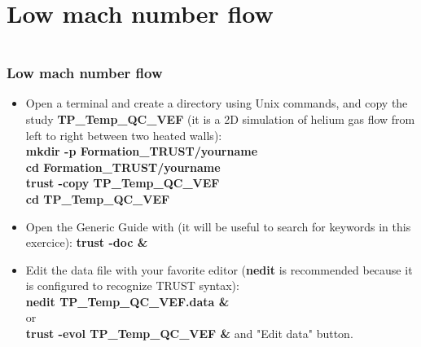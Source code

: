 \documentclass[10pt, hyperref={unicode=true,pdfusetitle, bookmarks=true,bookmarksnumbered=false,bookmarksopen=false, breaklinks=false,pdfborder={0 0 1},backref=true,colorlinks=true,linkcolor=darkblue,pageanchor}]{beamer}
\begin{document}
\section{{\bf{Low mach number flow}}}
\begin{frame}
\begin{columns}[c] 
\tableofcontents[sections={1-9},currentsection, currentsubsection]
\tableofcontents[sections={10-16},currentsection, currentsubsection]
\end{columns}
\end{frame}
\begin{frame}
\frametitle{Low mach number flow}
\begin{block}{}

\begin{itemize}
\item Open a terminal and create a directory using Unix commands, and copy the study \textbf{TP\_Temp\_QC\_VEF} (it is a 2D simulation of helium gas flow from left to right between two heated walls):\\
\textbf{mkdir -p Formation\_TRUST/yourname}\\
\textbf{cd Formation\_TRUST/yourname}\\
\textbf{trust -copy TP\_Temp\_QC\_VEF}\\
\textbf{cd TP\_Temp\_QC\_VEF}

\item Open the Generic Guide with (it will be useful to search for keywords in this exercice): \textbf{trust -doc \&}

\item Edit the data file with your favorite editor (\textbf{nedit} is recommended because it is configured to recognize TRUST syntax):\\
\textbf{nedit TP\_Temp\_QC\_VEF.data \&} \\
or \\
\textbf{trust -evol TP\_Temp\_QC\_VEF  \&} and "Edit data" button.
\end{itemize}

\end{block}
\end{frame}
\end{document}
